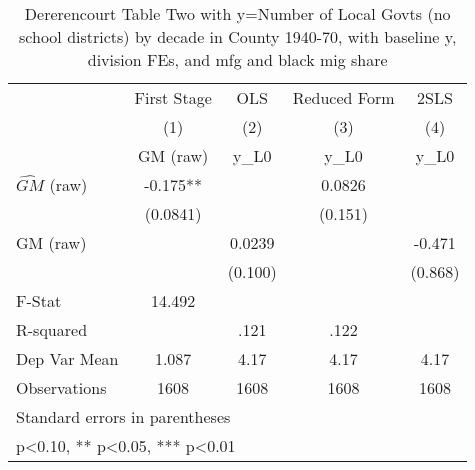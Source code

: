 \begin{table}[htbp]\centering
\def\sym#1{\ifmmode^{#1}\else\(^{#1}\)\fi}
\caption{Dererencourt Table Two with y=Number of Local Govts (no school districts) by decade in County 1940-70, with baseline y, division FEs, and mfg and black mig share}
\begin{tabular}{l*{4}{c}}
\toprule
                    & First Stage   &         OLS   &Reduced Form   &        2SLS   \\
                    &\multicolumn{1}{c}{(1)}&\multicolumn{1}{c}{(2)}&\multicolumn{1}{c}{(3)}&\multicolumn{1}{c}{(4)}\\
                    &\multicolumn{1}{c}{GM  (raw)}&\multicolumn{1}{c}{y\_L0}&\multicolumn{1}{c}{y\_L0}&\multicolumn{1}{c}{y\_L0}\\
\midrule
$\hat{GM}$ (raw)    &      -0.175** &               &      0.0826   &               \\
                    &    (0.0841)   &               &     (0.151)   &               \\
\addlinespace
GM  (raw)           &               &      0.0239   &               &      -0.471   \\
                    &               &     (0.100)   &               &     (0.868)   \\
\midrule
F-Stat              &      14.492   &               &               &               \\
R-squared           &               &        .121   &        .122   &               \\
Dep Var Mean        &       1.087   &        4.17   &        4.17   &        4.17   \\
Observations        &        1608   &        1608   &        1608   &        1608   \\
\bottomrule
\multicolumn{5}{l}{\footnotesize Standard errors in parentheses}\\
\multicolumn{5}{l}{\footnotesize * p<0.10, ** p<0.05, *** p<0.01}\\
\end{tabular}
\end{table}
